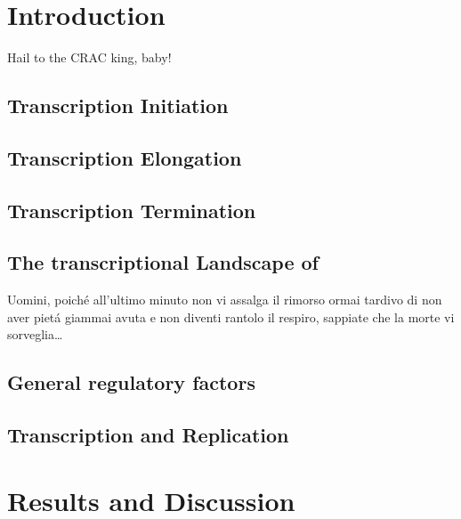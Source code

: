 \documentclass{Thesis}
\begin{document}
\frontmatter

\part{Introduction}

\begin{savequote}[70mm]
Hail to the CRAC king, baby!
\end{savequote}

\chapter{Transcription Initiation}
	
\chapter{Transcription Elongation}
	
\chapter{Transcription Termination}
	
\chapter{The transcriptional Landscape of \cer{}}
	
	
\begin{savequote}[70mm]
Uomini, poich\'{e} all'ultimo minuto non vi assalga il rimorso ormai tardivo di non aver piet\'{a} giammai avuta e non diventi rantolo il respiro, sappiate che la morte vi sorveglia\ldots
{} 
\end{savequote}
\chapter{General regulatory factors}
	

\chapter{Transcription and Replication}
	


\part{Results and Discussion}
	
%	
%	




\singlespacing


\end{document}
